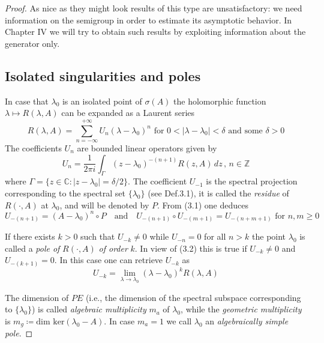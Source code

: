 \begin{proof}
As nice as they might look results of this type are unsatisfactory: we need information on the semigroup in order to estimate its asymptotic behavior.
In Chapter IV we will try to obtain such results by exploiting information about the generator only.

\subsection{Isolated singularities and poles}\label{subsec:a3-3.6}

In case that $\lambda_{0}$ is an isolated point of $\sigma(A)$ the holomorphic function $\lambda \mapsto R(\lambda,A)$ can be expanded as a Laurent series
\[
R(\lambda,A) = \sum_{n=-\infty}^{+\infty} U_{n}(\lambda - \lambda_{0})^{n} \text{ for } 0 < |\lambda - \lambda_{0}| < \delta \text{ and some } \delta > 0
\]
The coefficients $U_{n}$ are bounded linear operators given by
\begin{equation}\label{eq:a3-3.1}
	U_{n} = \frac{1}{2\pi i}\int_{\Gamma} (z - \lambda_{0})^{-(n+1)}R(z,A) \, dz \, , \, n \in \mathbb{Z}
\end{equation}
where $\Gamma = \{z \in \mathbb{C} \colon |z - \lambda_{0}| = \delta/2\}$.
The coefficient $U_{-1}$ is the spectral projection corresponding to the spectral set $\{\lambda_{0}\}$ (see Def.3.1), it is called the \emph{residue} of $R(\cdot,A)$ at $\lambda_{0}$, and will be denoted by $P$.
From (3.1) one deduces
\begin{equation}\label{eq:a3-3.2}
	U_{-(n+1)} = (A - \lambda_{0})^{n} \circ P \quad \text{and} \quad U_{-(n+1)} \circ U_{-(m+1)} = U_{-(n+m+1)} \text{ for } n, m \geq 0
\end{equation}


\newpage
If there exists $k > 0$ such that $U_{-k} \neq 0$ while $U_{-n} = 0$ for all $n > k$ the point $\lambda_{0}$ is called a \emph{pole of} $R(\cdot,A)$ \emph{of order} $k$.
In view of (3.2) this is true if $U_{-k} \neq 0$ and $U_{-(k+1)} = 0$.
In this case one can retrieve $U_{-k}$ as
\begin{equation}\label{eq:a3-3.3}
	U_{-k} = \lim_{\lambda \to \lambda_{0}} (\lambda - \lambda_{0})^{k}R(\lambda,A)
\end{equation}

The dimension of $PE$ (i.e., the dimension of the spectral subspace corresponding to $\{\lambda_{0}\}$) is called \emph{algebraic multiplicity} $m_{a}$ of $\lambda_{0}$, while the \emph{geometric multiplicity} is $m_{g} \coloneqq \text{dim ker}(\lambda_{0} - A)$.
In case $m_{a} = 1$ we call $\lambda_{0}$ an \emph{algebraically simple pole}.


\end{proof}
